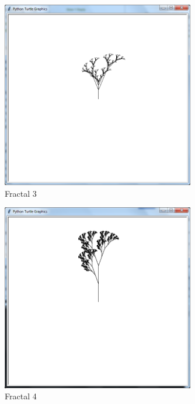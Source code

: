 \begin{figure}[tbh]
\begin{center}
\includegraphics[width=0.75\textwidth]{fractal3.png}
\end{center}
\caption{Fractal 3\label{fig:gprun}}
\end{figure}

\begin{figure}[tbh]
\begin{center}
\includegraphics[width=0.75\textwidth]{fractal4.png}
\end{center}
\caption{Fractal 4\label{fig:gprun}}
\end{figure}	

